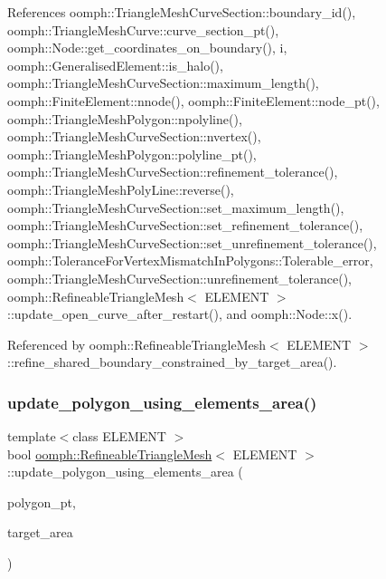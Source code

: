 References oomph\+::\+Triangle\+Mesh\+Curve\+Section\+::boundary\+\_\+id(), oomph\+::\+Triangle\+Mesh\+Curve\+::curve\+\_\+section\+\_\+pt(), oomph\+::\+Node\+::get\+\_\+coordinates\+\_\+on\+\_\+boundary(), i, oomph\+::\+Generalised\+Element\+::is\+\_\+halo(), oomph\+::\+Triangle\+Mesh\+Curve\+Section\+::maximum\+\_\+length(), oomph\+::\+Finite\+Element\+::nnode(), oomph\+::\+Finite\+Element\+::node\+\_\+pt(), oomph\+::\+Triangle\+Mesh\+Polygon\+::npolyline(), oomph\+::\+Triangle\+Mesh\+Curve\+Section\+::nvertex(), oomph\+::\+Triangle\+Mesh\+Polygon\+::polyline\+\_\+pt(), oomph\+::\+Triangle\+Mesh\+Curve\+Section\+::refinement\+\_\+tolerance(), oomph\+::\+Triangle\+Mesh\+Poly\+Line\+::reverse(), oomph\+::\+Triangle\+Mesh\+Curve\+Section\+::set\+\_\+maximum\+\_\+length(), oomph\+::\+Triangle\+Mesh\+Curve\+Section\+::set\+\_\+refinement\+\_\+tolerance(), oomph\+::\+Triangle\+Mesh\+Curve\+Section\+::set\+\_\+unrefinement\+\_\+tolerance(), oomph\+::\+Tolerance\+For\+Vertex\+Mismatch\+In\+Polygons\+::\+Tolerable\+\_\+error, oomph\+::\+Triangle\+Mesh\+Curve\+Section\+::unrefinement\+\_\+tolerance(), oomph\+::\+Refineable\+Triangle\+Mesh$<$ E\+L\+E\+M\+E\+N\+T $>$\+::update\+\_\+open\+\_\+curve\+\_\+after\+\_\+restart(), and oomph\+::\+Node\+::x().



Referenced by oomph\+::\+Refineable\+Triangle\+Mesh$<$ E\+L\+E\+M\+E\+N\+T $>$\+::refine\+\_\+shared\+\_\+boundary\+\_\+constrained\+\_\+by\+\_\+target\+\_\+area().

\mbox{\label{classoomph_1_1RefineableTriangleMesh_aebc1eb8c96cac1b50cacbe317351e3fb}} 
\subsubsection{\texorpdfstring{update\+\_\+polygon\+\_\+using\+\_\+elements\+\_\+area()}{update\_polygon\_using\_elements\_area()}}
{\footnotesize\ttfamily template$<$class E\+L\+E\+M\+E\+NT $>$ \\
bool \hyperlink{classoomph_1_1RefineableTriangleMesh}{oomph\+::\+Refineable\+Triangle\+Mesh}$<$ E\+L\+E\+M\+E\+NT $>$\+::update\+\_\+polygon\+\_\+using\+\_\+elements\+\_\+area (\begin{DoxyParamCaption}\item[{\hyperlink{classoomph_1_1TriangleMeshPolygon}{Triangle\+Mesh\+Polygon} $\ast$\&}]{polygon\+\_\+pt,  }\item[{const \hyperlink{classoomph_1_1Vector}{Vector}$<$ double $>$ \&}]{target\+\_\+area }\end{DoxyParamCaption})\hspace{0.3cm}{\ttfamily [protected]}}



